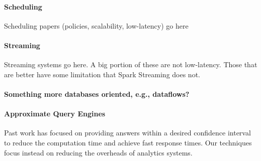 
\paragraph {\bf Scheduling} Scheduling papers (policies, scalability, low-latency) go here~\cite{Sparrow}

\paragraph {\bf Streaming} Streaming systems go here. A big portion of these are not low-latency. Those that are better have some limitation that Spark Streaming does not.

\paragraph {\bf Something more databases oriented, e.g., dataflows?}

\paragraph {\bf Approximate Query Engines} Past work \cite{BlinkDB, OnlineAggregation} has focused on providing answers within a desired confidence interval to reduce the computation time and achieve fast response times. Our techniques focus instead on reducing the overheads of analytics systems.


